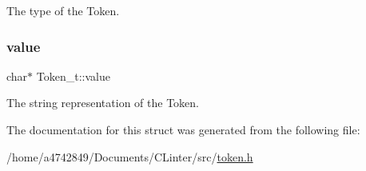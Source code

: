 The type of the Token. \mbox{\label{structToken__t_ab1fc0d2fffac8698ff813b530c326979}} 
\subsubsection{\texorpdfstring{value}{value}}
{\footnotesize\ttfamily char$\ast$ Token\+\_\+t\+::value}

The string representation of the Token. 

The documentation for this struct was generated from the following file\+:\begin{DoxyCompactItemize}
\item 
/home/a4742849/\+Documents/\+C\+Linter/src/\hyperlink{token_8h}{token.\+h}\end{DoxyCompactItemize}
